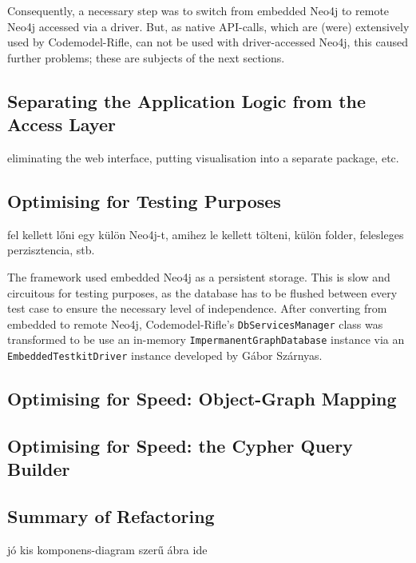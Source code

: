 Consequently, a necessary step was to switch from embedded Neo4j to remote Neo4j accessed via a driver. But, as native API-calls, which are (were) extensively used by Codemodel-Rifle, can not be used with driver-accessed Neo4j, this caused further problems; these are subjects of the next sections.


\subsection{Separating the Application Logic from the Access Layer}

eliminating the web interface, putting visualisation into a separate package, etc.


\subsection{Optimising for Testing Purposes}

fel kellett lőni egy külön Neo4j-t, amihez le kellett tölteni, külön folder, felesleges perzisztencia, stb.

The framework used embedded Neo4j as a persistent storage. This is slow and circuitous for testing purposes, as the database has to be flushed between every test case to ensure the necessary level of independence. After converting from embedded to remote Neo4j, Codemodel-Rifle's \texttt{DbServicesManager} class was transformed to be use an in-memory \texttt{ImpermanentGraphDatabase} instance via an \texttt{EmbeddedTestkitDriver} instance developed by Gábor Szárnyas.~\cite{neo4j-drivers}


\subsection{Optimising for Speed: Object-Graph Mapping}


\subsection{Optimising for Speed: the Cypher Query Builder}


\subsection{Summary of Refactoring}

jó kis komponens-diagram szerű ábra ide